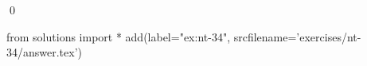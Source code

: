 
\begin{ex} 
  \label{ex:nt-34}
  
  \qed
\end{ex} 
\begin{python0}
from solutions import *
add(label="ex:nt-34",
    srcfilename='exercises/nt-34/answer.tex') 
\end{python0}

